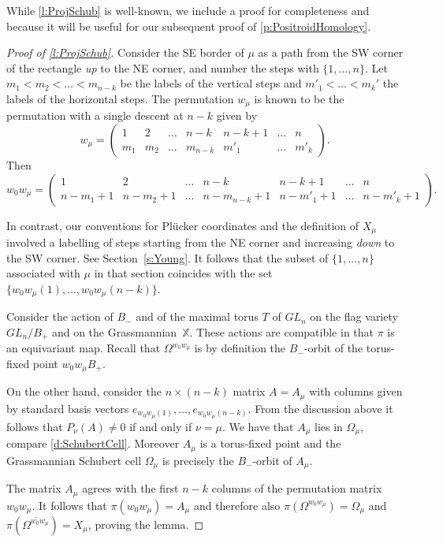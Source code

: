 \documentclass{amsart}
\theoremstyle{definition}
\numberwithin{equation}{section}
\begin{document}
While \cref{l:ProjSchub} is well-known, we include a proof for completeness and because it will
be useful for our subsequent proof of 
 \cref{p:PositroidHomology}.
\begin{proof}[Proof of \cref{l:ProjSchub}]
Consider the SE border of $\mu$ as a path from the SW corner of the rectangle \textit{up} to the NE corner, and number the steps with $\{1,\dotsc, n\}$. Let $m_1<m_2<\dotsc < m_{n-k}$ be the labels of the vertical steps and $m'_1<\dotsc < m_k'$ the labels of the horizontal steps. The permutation $w_\mu$ is known to be the permutation 
	with  a single descent at $n-k$ given by
\begin{equation}
w_\mu=\begin{pmatrix} 
1 &2     &\dotsc & n-k &n-k+1&\dotsc & n\\
m_1& m_2 &\dotsc & m_{n-k}& m'_1&\dotsc &m'_k
\end{pmatrix}.
\end{equation}
Then
\begin{equation}
w_0w_\mu=\begin{pmatrix} 
1 &2     &\dotsc & n-k &n-k+1&\dotsc & n\\
n-m_1+1& n-m_2+1 &\dotsc & n-m_{n-k}+1& n-m'_1+1&\dotsc &n-m'_k+1
\end{pmatrix}.
\end{equation}

In contrast, our conventions for Pl\"ucker coordinates and the definition of $X_\mu$  involved a labelling of steps starting from the NE corner and increasing \textit{down} to the SW corner. See Section~\ref{s:Young}. It follows that the subset of $\{1,\dotsc, n\}$ associated with $\mu$ in that section coincides with the set $\{w_0w_\mu(1),\dotsc, w_0w_\mu(n-k)\}$. 

Consider the action of $B_-$ and of the maximal torus $T$ of $GL_n$ on the flag variety~$GL_n/B_+$ and on the Grassmannian~$\mathbb X$. These actions are compatible in that $\pi$ is an equivariant map. Recall that $\Omega^{w_0w_\mu}$ is by definition the $B_-$-orbit of the torus-fixed point $w_0w_\mu B_+$. 

On the other hand, consider the $n\times (n-k)$ matrix $A=A_\mu$ with columns given by standard basis vectors 
$e_{w_0w_\mu(1)},\dotsc,e_{w_0w_\mu(n-k)}$. From the discussion above it follows that $P_{\nu}(A)\ne 0$ if and only if $\nu=\mu$. We have that $A_\mu$ lies in $\Omega_\mu$, compare \cref{d:SchubertCell}. Moreover $A_\mu$ is a torus-fixed point and the Grassmannian Schubert cell $\Omega_\mu$ is precisely the $B_-$-orbit of  $A_\mu$.

The matrix $A_\mu$ agrees with the first $n-k$ columns of the permutation matrix $w_0w_\mu$. It follows that $\pi(w_0w_\mu)=A_\mu$ and  therefore also $\pi(\Omega^{w_0w_\mu })=\Omega_\mu$ and  $\pi(\overline{\Omega^{w_0w_\mu}})=X_\mu$, proving the lemma.
\end{proof}
\end{document}
